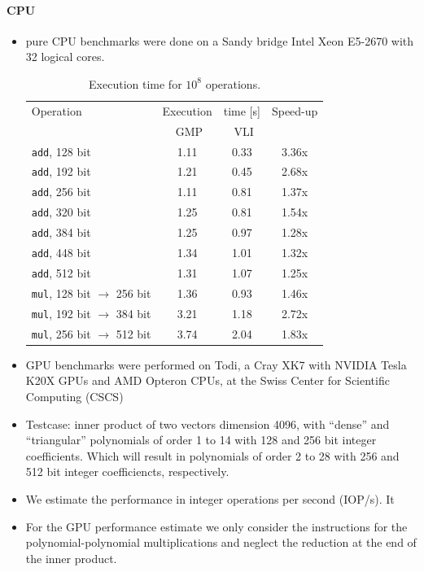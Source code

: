 \documentclass[oribibl]{llncs2e/llncs}
\begin{document}
\paragraph{CPU}
\begin{itemize}
\item pure CPU benchmarks were done on a Sandy bridge Intel Xeon E5-2670 with 32 logical cores.
\begin{table}
\begin{center}
\begin{tabular}{l|cc|c}
 Operation & Execution & time [s] & Speed-up\\
   & \, GMP\,  & \, VLI\,  & \\
 \hline
\verb|add|, 128 bit & 1.11 & 0.33 & 3.36x \\
\verb|add|, 192 bit & 1.21 & 0.45 & 2.68x \\
\verb|add|, 256 bit & 1.11 & 0.81 & 1.37x \\
\verb|add|, 320 bit & 1.25 & 0.81 & 1.54x \\
\verb|add|, 384 bit & 1.25 & 0.97 & 1.28x \\
\verb|add|, 448 bit & 1.34 & 1.01 & 1.32x \\
\verb|add|, 512 bit & 1.31 & 1.07 & 1.25x \\
\hline
\verb|mul|, 128 bit $\rightarrow$ 256 bit & 1.36 & 0.93 & 1.46x \\
\verb|mul|, 192 bit $\rightarrow$ 384 bit & 3.21 & 1.18 & 2.72x \\
\verb|mul|, 256 bit $\rightarrow$ 512 bit & 3.74 & 2.04 & 1.83x \\ 
\end{tabular}
\caption{Execution time for $10^8$ operations.}
\end{center}
\end{table}
\item GPU benchmarks were performed on Todi, a Cray XK7 with NVIDIA Tesla K20X GPUs and AMD Opteron CPUs, at the Swiss Center for Scientific Computing (CSCS)
\item Testcase: inner product of two vectors dimension 4096, with ``dense'' and
``triangular'' polynomials of order 1 to 14 with 128 and 256 bit integer
coefficients. Which will result in polynomials of order 2 to 28 with 256 and 512 bit integer coefficiencts, respectively.
\item We estimate the performance in integer operations per second (IOP/s).
It
\item For the GPU performance estimate we only consider the instructions for the polynomial-polynomial multiplications and neglect the reduction at the end of the inner product.


\end{itemize}
\end{document}
